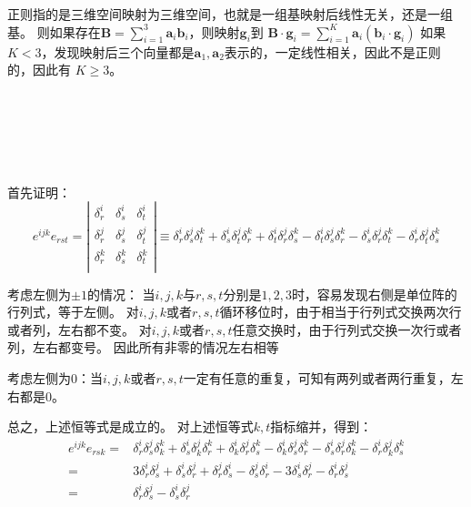 \documentclass[UTF8,zihao=5]{ctexart}
\newcommand{\bm}[1]{{\mathbf{#1}}}
\begin{document}
正则指的是三维空间映射为三维空间，也就是一组基映射后线性无关，还是一组基。
则如果存在$\bm{B}=\sum_{i=1}^{3}{\bm{a}_i\bm{b}_i}$，则映射$\bm{g}_i$到
$\bm{B}\cdot\bm{g}_i=\sum_{i=1}^{K}{\bm{a}_i\left(\bm{b}_i\cdot\bm{g}_i\right)}$
如果$K<3$，发现映射后三个向量都是$\bm{a}_1,\bm{a}_2$表示的，一定线性相关，因此不是正则的，因此有
$K\ge3$。





\ 

\ 

\ 


首先证明：
\begin{equation*}
    e^{ijk}e_{rst}=
    \left|
    \begin{matrix}
        \delta^i_r & \delta^i_s & \delta^i_t \\
        \delta^j_r & \delta^j_s & \delta^j_t \\
        \delta^k_r & \delta^k_s & \delta^k_t \\
    \end{matrix}
    \right|
    \equiv 
    \delta^i_r\delta^j_s\delta^k_t +
    \delta^i_s\delta^j_t\delta^k_r +
    \delta^i_t\delta^j_r\delta^k_s -
    \delta^i_t\delta^j_s\delta^k_r -
    \delta^i_s\delta^j_r\delta^k_t -
    \delta^i_r\delta^j_t\delta^k_s
\end{equation*}

考虑左侧为$\pm 1$的情况：
当$i,j,k$与$r,s,t$分别是$1,2,3$时，容易发现右侧是单位阵的行列式，等于左侧。
对$i,j,k$或者$r,s,t$循环移位时，由于相当于行列式交换两次行或者列，左右都不变。
对$i,j,k$或者$r,s,t$任意交换时，由于行列式交换一次行或者列，左右都变号。
因此所有非零的情况左右相等

考虑左侧为$0$：当$i,j,k$或者$r,s,t$一定有任意的重复，可知有两列或者两行重复，左右都是0。

总之，上述恒等式是成立的。
对上述恒等式$k,t$指标缩并，得到：
\begin{equation*}
    \begin{aligned}
        e^{ijk}e_{rsk}=&
    \delta^i_r\delta^j_s\delta^k_k +
    \delta^i_s\delta^j_k\delta^k_r +
    \delta^i_k\delta^j_r\delta^k_s -
    \delta^i_k\delta^j_s\delta^k_r -
    \delta^i_s\delta^j_r\delta^k_k -
    \delta^i_r\delta^j_k\delta^k_s\\
    =&
    3\delta^i_r\delta^j_s +
    \delta^i_s\delta^j_r +
    \delta^j_r\delta^i_s -
    \delta^j_s\delta^i_r -
    3\delta^i_s\delta^j_r -
    \delta^i_r\delta^j_s 
    \\
    =&\delta^i_r\delta^j_s -
    \delta^i_s\delta^j_r 
    \end{aligned}
\end{equation*}
\end{document}
